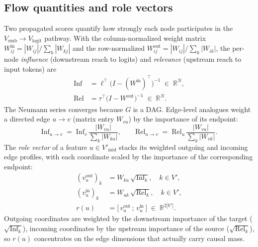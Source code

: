     \subsection{Flow quantities and role vectors}\label{sec:flow}
    Two propagated scores quantify how strongly each node participates in
    the $V_{\text{emb}} \to V_{\text{logit}}$ pathway. With the
    column-normalized weight matrix
    $W^{\text{in}}_{ij} = |W_{ij}|/\sum_k |W_{kj}|$ and the row-normalized
    $W^{\text{out}}_{ij} = |W_{ij}|/\sum_k |W_{ik}|$, the per-node
    \emph{influence} (downstream reach to logits) and \emph{relevance}
    (upstream reach to input tokens) are
    \begin{align}
    \mathrm{Inf} &= \ell^\top \bigl(I - (W^{\text{in}})^\top\bigr)^{-1}
    \;\in\; \mathbb{R}^N,
    \label{eq:inf}\\
    \mathrm{Rel} &= \tau^\top \bigl(I - W^{\text{out}}\bigr)^{-1}
    \;\in\; \mathbb{R}^N.
    \label{eq:rel}
    \end{align}
    The Neumann series converges because $G$ is a DAG. Edge-level
    analogues weight a directed edge $u \to v$ (matrix entry $W_{vu}$)
    by the importance of its endpoint:
    \begin{equation}
    \mathrm{Inf}_{u \to v}
    \;=\;
    \mathrm{Inf}_v \,\frac{|W_{vu}|}{\sum_k |W_{ku}|},
    \qquad
    \mathrm{Rel}_{u \to v}
    \;=\;
    \mathrm{Rel}_u \,\frac{|W_{vu}|}{\sum_k |W_{vk}|}.
    \label{eq:inf-rel-edge}
    \end{equation}
    The \emph{role vector} of a feature $u \in V'_{\text{mid}}$ stacks its
    weighted outgoing and incoming edge profiles, with each coordinate
    scaled by the importance of the corresponding endpoint:
    \begin{align}
    (v_u^{\text{out}})_k &= W_{ku}\,\sqrt{\mathrm{Inf}_k},
    \quad k \in V', \nonumber\\
    (v_u^{\text{in}})_k  &= W_{uk}\,\sqrt{\mathrm{Rel}_k},
    \quad k \in V', \nonumber\\
    r(u) &= \bigl[\,v_u^{\text{out}}\,;\, v_u^{\text{in}}\,\bigr]
    \;\in\; \mathbb{R}^{2|V'|}.
    \label{eq:role}
    \end{align}
    Outgoing coordinates are weighted by the downstream importance of the
    target ($\sqrt{\mathrm{Inf}_k}$), incoming coordinates by the upstream
    importance of the source ($\sqrt{\mathrm{Rel}_k}$), so $r(u)$
    concentrates on the edge dimensions that actually carry causal mass.


